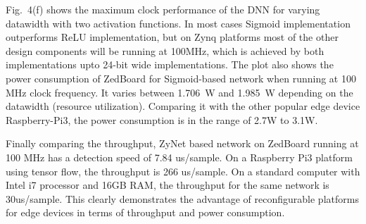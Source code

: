 Fig.~4(f) shows the maximum clock performance of the DNN for varying datawidth with two activation functions.
In most cases Sigmoid implementation outperforms ReLU implementation, but on Zynq platforms most of the other design components will be running at 100MHz, which is achieved by both implementations upto 24-bit wide implementations.
The plot also shows the power consumption of ZedBoard for Sigmoid-based network when running at 100 MHz clock frequency.
It varies between 1.706~W and 1.985~W depending on the datawidth (resource utilization).
Comparing it with the other popular edge device Raspberry-Pi3, the power consumption is in the range of 2.7W to 3.1W. 

Finally comparing the throughput, ZyNet based network on ZedBoard running at 100 MHz has a detection speed of 7.84 us/sample. On a Raspberry Pi3 platform using tensor flow, the throughput is 266 us/sample. On a standard computer with Intel i7 processor and 16GB RAM, the throughput for the same network is 30us/sample. This clearly demonstrates the advantage of reconfigurable platforms for edge devices in terms of throughput and power consumption.